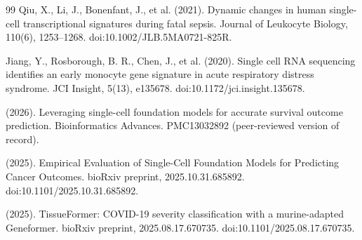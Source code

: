 \documentclass[11pt,a4paper]{article}
\begin{document}
\begin{thebibliography}{99}
Qiu, X., Li, J., Bonenfant, J., et al. (2021).
\newblock Dynamic changes in human single-cell transcriptional signatures during fatal sepsis.
\newblock Journal of Leukocyte Biology, 110(6), 1253--1268. doi:10.1002/JLB.5MA0721-825R.

Jiang, Y., Rosborough, B. R., Chen, J., et al. (2020).
\newblock Single cell RNA sequencing identifies an early monocyte gene signature in acute respiratory distress syndrome.
\newblock JCI Insight, 5(13), e135678. doi:10.1172/jci.insight.135678.

(2026).
\newblock Leveraging single-cell foundation models for accurate survival outcome prediction.
\newblock Bioinformatics Advances. PMC13032892 (peer-reviewed version of record).

(2025).
\newblock Empirical Evaluation of Single-Cell Foundation Models for Predicting Cancer Outcomes.
\newblock bioRxiv preprint, 2025.10.31.685892. doi:10.1101/2025.10.31.685892.

(2025).
\newblock TissueFormer: COVID-19 severity classification with a murine-adapted Geneformer.
\newblock bioRxiv preprint, 2025.08.17.670735. doi:10.1101/2025.08.17.670735.

\end{thebibliography}
\end{document}

